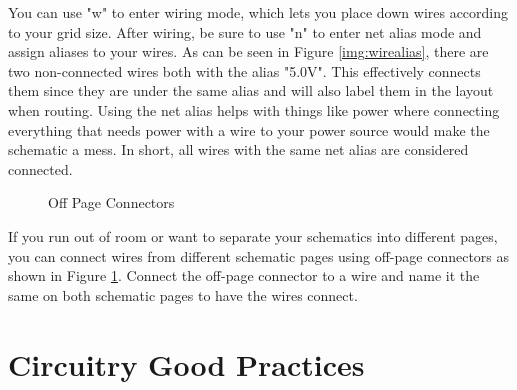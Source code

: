 You can use "w" to enter wiring mode, which lets you place down wires according to your grid size. After wiring, be sure to use
"n" to enter net alias mode and assign aliases to your wires. As can be seen in Figure \ref{img:wirealias}, there are two
non-connected wires both with the alias "5.0V". This effectively connects them since they are under the same alias and will also
label them in the layout when routing. Using the net alias helps with things like power where connecting everything that needs
power with a wire to your power source would make the schematic a mess. In short, all wires with the same net alias are considered
connected.

\begin{figure}[H]
  \centering
\caption{Off Page Connectors}
\label{img:offpageconn}
\end{figure}

If you run out of room or want to separate your schematics into different pages, you can connect wires from different schematic
pages using off-page connectors as shown in Figure \ref{img:offpageconn}. Connect the off-page connector to a wire and name it
the same on both schematic pages to have the wires connect.

\section{Circuitry Good Practices}
